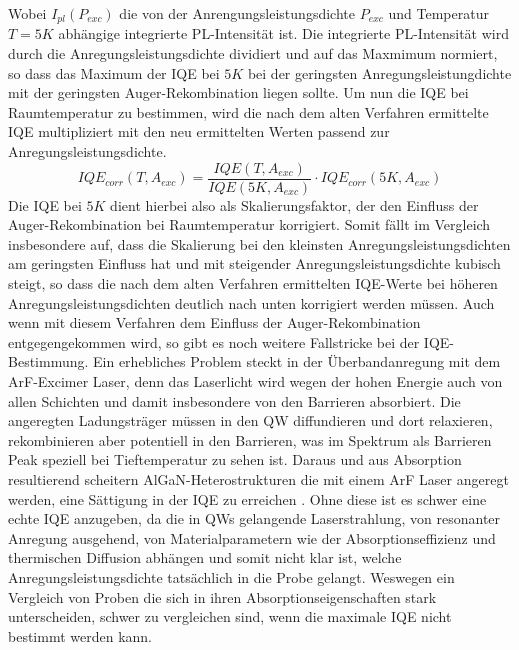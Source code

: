 \vspace{0.1cm}
\noindent
%
Wobei $I_{pl}(P_{exc})$ die von der Anrengungsleistungsdichte $P_{exc}$ und Temperatur $T = 5K$ abhängige integrierte PL-Intensität ist. Die integrierte PL-Intensität wird durch die Anregungsleistungsdichte dividiert und auf das Maxmimum normiert, so dass das Maximum der IQE bei $5K$ bei der geringsten Anregungsleistungdichte mit der geringsten Auger-Rekombination liegen sollte. Um nun die IQE bei Raumtemperatur zu bestimmen, wird die nach dem alten Verfahren ermittelte IQE multipliziert mit den neu ermittelten Werten passend zur Anregungsleistungsdichte. 
%
\begin{equation}
    IQE_{corr}(T, A_{exc}) = \frac{IQE(T,A_{exc})}{IQE(5K,A_{exc})} \cdot IQE_{corr}(5K,A_{exc})
    \label{eq:iqetrue300k}
\end{equation}
%
Die IQE bei $5K$ dient hierbei also als Skalierungsfaktor, der den Einfluss der Auger-Rekombination bei Raumtemperatur korrigiert. Somit fällt im Vergleich insbesondere auf, dass die Skalierung bei den kleinsten Anregungsleistungsdichten am geringsten Einfluss hat und mit steigender Anregungsleistungsdichte kubisch steigt, so dass die nach dem alten Verfahren ermittelten IQE-Werte bei höheren Anregungsleistungsdichten deutlich nach unten korrigiert werden müssen. 
Auch wenn mit diesem Verfahren dem Einfluss der Auger-Rekombination entgegengekommen wird, so gibt es noch weitere Fallstricke bei der IQE-Bestimmung. Ein erhebliches Problem steckt in der Überbandanregung mit dem ArF-Excimer Laser, denn das Laserlicht wird wegen der hohen Energie auch von allen Schichten und damit insbesondere von den Barrieren absorbiert. Die angeregten Ladungsträger müssen in den QW diffundieren und dort relaxieren, rekombinieren aber potentiell in den Barrieren, was im Spektrum als Barrieren Peak speziell bei Tieftemperatur zu sehen ist.
Daraus und aus Absorption resultierend scheitern AlGaN-Heterostrukturen die mit einem ArF Laser angeregt werden, eine Sättigung in der IQE zu erreichen \cite{doi:10.1063/1.4965298} \cite{doi:10.1063/1.5044383}. Ohne diese ist es schwer eine echte IQE anzugeben, da die in QWs gelangende Laserstrahlung, von resonanter Anregung ausgehend, von Materialparametern wie der Absorptionseffizienz und thermischen Diffusion abhängen und somit nicht klar ist, welche Anregungsleistungsdichte tatsächlich in die Probe gelangt. Weswegen ein Vergleich von Proben die sich in ihren Absorptionseigenschaften stark unterscheiden, schwer zu vergleichen sind, wenn die maximale IQE nicht bestimmt werden kann. 

